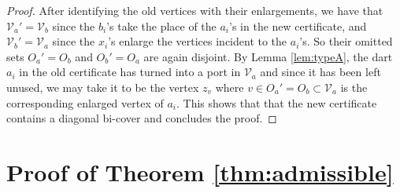 \documentclass[11pt]{article}
\theoremstyle{remark}
\newcommand{\cV}{\mathcal V}
\begin{document}
\begin{proof}
After identifying the old vertices
with their enlargements, we have that $\cV_a'=\cV_b$ since the $b_i$'s take the place of the $a_i$'s in the new certificate, and $\cV_b'=\cV_a$ since the $x_i$'s enlarge the vertices incident to the $a_i$'s. So their omitted sets $O_a'=O_b$ and $O_b'=O_a$ are again disjoint. By Lemma \ref{lem:typeA}, the dart $a_i$ in the old certificate has turned into a port in $\cV_a$ and since it has been left unused, we may take it to be the vertex $z_v$ where $v\in O_a'=O_b \subset \cV_a$ is the corresponding enlarged vertex of $a_i$. This shows that that the new certificate contains a diagonal bi-cover and concludes the proof.
\end{proof}

\section{Proof of Theorem \ref{thm:admissible}} \label{sec:existenceproof}

\end{document}
